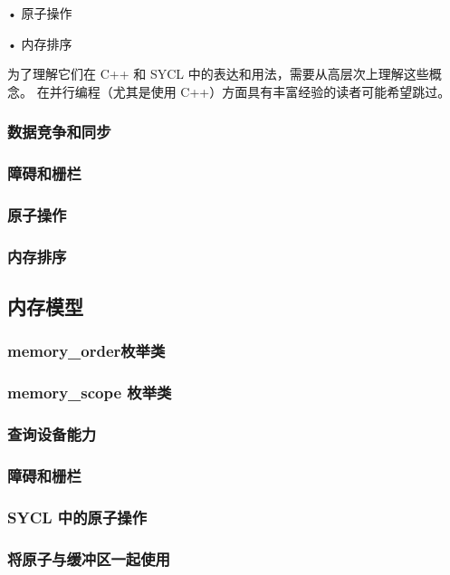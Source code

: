 • 原子操作

• 内存排序

为了理解它们在 C++ 和 SYCL 中的表达和用法，需要从高层次上理解这些概念。 在并行编程（尤其是使用 C++）方面具有丰富经验的读者可能希望跳过。

\subsubsection{数据竞争和同步}

\subsubsection{障碍和栅栏}

\subsubsection{原子操作}

\subsubsection{内存排序}

\subsection{内存模型}

\subsubsection{memory\_order枚举类}

\subsubsection{memory\_scope 枚举类}

\subsubsection{查询设备能力}

\subsubsection{障碍和栅栏}

\subsubsection{SYCL 中的原子操作}

\subsubsection{将原子与缓冲区一起使用}

